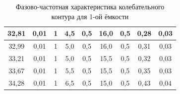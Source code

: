 \documentclass[a4paper, 12pt]{article}
\begin{document}
\begin{table}[h!]
\begin{center}
\begin{tabular}{|c|c|c|c|c|c|c|c|c|}
32,81  & 0,01    & 1          & 4,5    & 0,5     & 16,0    & 0,5      & 0,28         & 0,03            \\ \hline
32,99  & 0,01    & 1          & 5,0    & 0,5     & 16,0    & 0,5      & 0,31         & 0,03            \\ \hline
33,21  & 0,01    & 1          & 5,0    & 0,5     & 15,5    & 0,5      & 0,32         & 0,03            \\ \hline
33,67  & 0,01    & 1          & 5,5    & 0,5     & 15,5    & 0,5      & 0,35         & 0,03            \\ \hline
34,28  & 0,01    & 1          & 6,5    & 0,5     & 15,0    & 0,5      & 0,43         & 0,04            \\ \hline
\end{tabular}
\end{center}
\caption{Фазово-частотная характеристика колебательного контура для 1-ой ёмкости}
\label{tab4}
\end{table}
\end{document}
